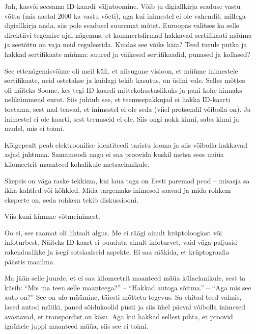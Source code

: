 Jah, kasvõi seesama ID-kaardi väljatoomine. Võib ju digiallkirja seaduse vastu 
võtta (mis aastal 2000 ka vastu võeti), aga kui inimestel ei ole vahendit, 
millega digiallkirja anda, siis pole seadusel suuremat mõtet. 
Euroopas valitses ka selle direktiivi tegemise ajal nägemus, et 
kommertsfirmad hakkavad sertifikaati müüma ja seetõttu on vaja neid 
reguleerida. Kuidas see võiks käia? Teed turule putka ja hakkad sertifikaate 
müüma: suured ja väikesed sertifikaadid, punased ja kollased? 

See ettenägemisvõime oli meil küll, et niisugune visioon, et müüme inimestele 
sertifikaate, neid ostetakse ja kuidagi tekib kasutus, on üdini vale. Selles mõttes oli näiteks Soome, kes tegi ID-kaardi 
mittekohustuslikuks ja pani kohe hinnaks nelikümmend eurot. Siis juhtub see, et teenusepakkujad ei hakka ID-kaarti toetama, sest 
nad teavad, et inimestel ei ole seda (viiel protsendil võibolla on). Ja inimestel ei ole kaarti, sest teenuseid ei 
ole. Siis ongi nokk kinni, saba kinni ja mudel, mis ei toimi. 

Kõigepealt peab elektroonilise identiteedi 
taristu looma ja siis võibolla hakkavad asjad juhtuma. Samamoodi nagu ei 
saa proovida kuskil metsa sees müüa kilomeetrit maanteed kohalikule 
metsaelanikule. 


Skepsis on väga raske tekkima, kui laua taga on Eesti paremad pead – misasja sa ikka kahtled või kõhkled. Mida targemaks inimesed saavad ja 
mida rohkem eksperte on, seda rohkem tekib diskussiooni. 


Viis kuni kümme võtmeinimest.


Oo ei, see raamat oli lihtsalt algus. Me ei räägi ainult 
krüptoloogiast või infoturbest. Näiteks ID-kaart ei puuduta ainult 
infoturvet, vaid väga paljusid rakenduslikke ja isegi sotsiaalseid aspekte. Ei saa rääkida, et krüptograafia päästis maailma. 


Ma jään selle juurde, et ei saa kilomeetrit maanteed müüa 
külaelanikule, sest ta küsib: \enquote{Mis ma teen selle maanteega?} – 
\enquote{Hakkad autoga sõitma.} – \enquote{Aga mis see auto on?} See on 
ufo müümine, täiesti mõttetu tegevus. Sa ehitad teed valmis, lased autod müüki, 
paned sõidukoolid püsti ja siis ühel päeval võibolla inimesed avastavad, et 
transpordist on kasu. Aga kui hakkad sellest pihta, et proovid 
igaühele juppi maanteed müüa, siis see ei toimi. 

